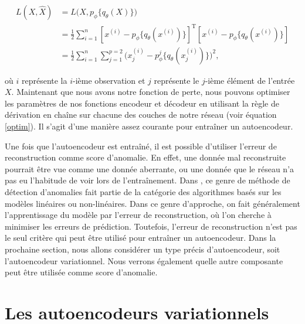 \begin{equation*} \label{perte1}
\begin{split}
L(X,\hat{X}) & = L\big(X, p_\phi\{q_\theta(X)\}\big) \\
& = \frac{1}{2} \sum_{i=1}^{n} [x^{(i)}-p_\phi\{q_\theta(x^{(i)})\}]^{\text{T}}[x^{(i)}-p_\phi\{q_\theta(x^{(i)})\}] \\
& = \frac{1}{2} \sum_{i=1}^{n} \sum_{j=1}^{p=2} \big(x_{j}^{(i)}-p^j_\phi\{q_\theta(x_{j}^{(i)})\}\big)^2,
\end{split}
\end{equation*}

où $i$ représente la $i$-ième observation et $j$ représente le $j$-ième élément de l'entrée $X$. Maintenant que nous avons notre fonction de perte, nous pouvons optimiser les paramètres de nos fonctions encodeur et décodeur en utilisant la règle de dérivation en chaîne sur chacune des couches de notre réseau (voir équation \ref{optim}). Il s'agit d'une manière assez courante pour entraîner un autoencodeur.

Une fois que l'autoencodeur est entraîné, il est possible d'utiliser l'erreur de reconstruction comme score d'anomalie. En effet, une donnée mal reconstruite pourrait être vue comme une donnée aberrante, ou une donnée que le réseau n'a pas eu l'habitude de voir lors de l'entraînement. Dans  \cite{10.5555/3086742}, ce genre de méthode de détection d'anomalies fait partie de la catégorie des algorithmes basés sur les modèles linéaires ou non-linéaires. Dans ce genre d'approche, on fait généralement l'apprentissage du modèle par l'erreur de reconstruction, où l'on cherche à minimiser les erreurs de prédiction. Toutefois, l'erreur de reconstruction n'est pas le seul critère qui peut être utilisé pour entraîner un autoencodeur. Dans la prochaine section, nous allons considérer un type précis d'autoencodeur, soit l'autoencodeur variationnel. Nous verrons également quelle autre composante peut être utilisée comme score d'anomalie.

\section{Les autoencodeurs variationnels} \label{background-vae}

